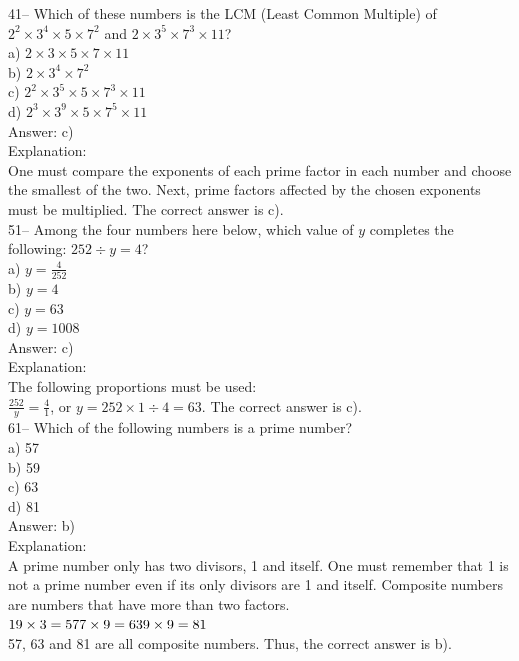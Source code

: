 \documentclass[letterpaper, 12pt]{article}
\begin{document}
41-- Which of these numbers is the LCM (Least Common Multiple) of
$2^{2}\times3^{4}\times5\times7^{2}$ and $2\times3^{5}\times7^{3}\times11$?\\
a) $2\times3\times5\times7\times11$\\
b) $2\times3^{4}\times7^{2}$\\
c) $2^{2}\times3^{5}\times5\times7^{3}\times11$\\
d) $2^{3}\times3^{9}\times5\times7^{5}\times11$\\

Answer: c)\\

Explanation:\\
One must compare the exponents of each prime factor in each number and choose the smallest of the two. Next, prime factors affected by the chosen exponents must be multiplied. The correct answer is c).\\


51-- Among the four numbers here below, which value of $y$ completes the following:
$252\div y=4$?\\
a) $y= \frac{4}{252}$\\[2mm]
b) $y= 4$\\[2mm]
c) $y= 63$\\[2mm]
d) $y= 1008$\\

Answer:  c)\\

Explanation:\\
The following proportions must be used: \\[2mm]
$\frac{252}{y}=\frac{4}{1}$, or $y = 252\times1\div4=63$. The correct answer is c).\\


61-- Which of the following numbers is a prime number?\\
a) 57\\
b) 59\\
c) 63\\
d) 81\\

Answer: b)\\

Explanation:\\
A prime number only has two divisors, 1 and itself. One must remember that 1 is not a prime number even if its only divisors are 1 and itself. Composite numbers are numbers that have more than two factors.\\
$19\times3 = 57\\
7\times9 = 63\\
9\times9 = 81$\\
57, 63 and 81 are all composite numbers. Thus, the correct answer is b).\\
\end{document}
